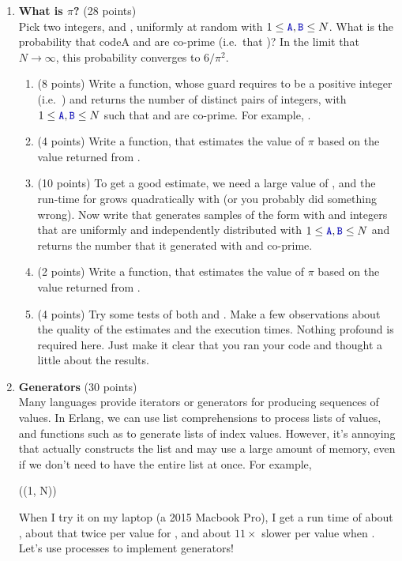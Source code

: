 \documentclass{article}
\begin{document}
\begin{enumerate}
  \item \textbf{What is $\pi$?} (28 points)\\
    Pick two integers,  and , uniformly at random
    with $1 \leq \code{A}, \code{B} \leq N$.  What is the probability that code{A} and 
    are co-prime (i.e.\ that )?
    In the limit that $N \rightarrow \infty$, this probability converges to $6/\pi^2$.
    \begin{enumerate}
      \item (8 points) Write a function,  whose guard requires  to be a positive integer
	(i.e.\ ) and returns the number of distinct pairs of integers, 
	with $1 \leq \code{A}, \code{B} \leq N$ such that  and  are co-prime.
	For example, .
      \item (4 points) Write a function,  that estimates the value of $\pi$ based on the
	value returned from .
      \item (10 points) To get a good estimate, we need a large value of , and the run-time for
	 grows quadratically with  (or you probably did something wrong).
	Now write  that generates  samples of the form 
	with  and  integers that are uniformly and independently distributed
	with $1 \leq \code{A}, \code{B} \leq N$ and returns the number that it generated
	with  and  co-prime.
      \item (2 points) Write a function,  that estimates the value of $\pi$ based on the
	value returned from .
      \item (4 points) Try some tests of both  and .
	Make a few observations about the quality of the estimates and the execution times.
	Nothing profound is required here.
	Just make it clear that you ran your code and thought a little about the results.
    \end{enumerate}

  \item \textbf{Generators} (30 points)\\
    Many languages provide iterators or generators for producing sequences of values.
    In Erlang, we can use list comprehensions to process lists of values,
    and functions such as  to generate lists of index values.
    However, it's annoying that  actually constructs the list and may
    use a large amount of memory, even if we don't need to have the entire list at once.
    For example,
    \begin{xcode}
      ((1, N))
    \end{xcode}
    When I try it on my laptop (a 2015 Macbook Pro), I get a run time of about 
    , about that twice per value for , and
    about $11\times$ slower per value when .
    Let's use processes to implement generators!


\end{enumerate}
\end{document}
